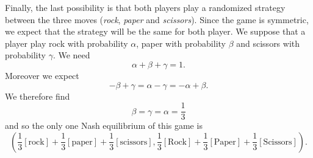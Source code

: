 Finally, the last possibility is that both players play a randomized strategy between the three moves (\textit{rock}, \textit{paper} and \textit{scissors}). Since the game is symmetric, we expect that the strategy will be the same for both player. We suppose that a player play rock with probability $\alpha$, paper with probability $\beta$ and scissors with probability $\gamma$. 
We need 
\[
\alpha + \beta + \gamma = 1.
\]
Moreover we expect
\[
-\beta + \gamma = \alpha - \gamma = - \alpha + \beta.
\]
We therefore find 
\[
\beta = \gamma = \alpha = \dfrac{1}{3}
\]
and so the only one Nash equilibrium of this game is 
\[
\left(\dfrac{1}{3}[\text{rock}] + \dfrac{1}{3}[\text{paper}] + \dfrac{1}{3}[\text{scissors}], \dfrac{1}{3}[\text{Rock}] + \dfrac{1}{3}[\text{Paper}] + \dfrac{1}{3}[\text{Scissors}]\right).
\]
